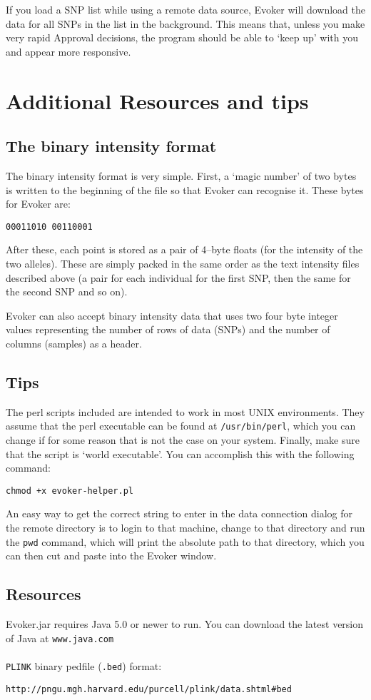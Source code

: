 \documentclass{article}
\begin{document}
If you load a SNP list while using a remote data source, Evoker will download the data for all SNPs in the list in the background. This means that, unless you make very rapid Approval decisions, the program should be able to `keep up' with you and appear more responsive.

\section{Additional Resources and tips}

\subsection{The binary intensity format}

The binary intensity format is very simple. First, a `magic number' of two bytes is written to the beginning of the file so that Evoker can recognise it. These bytes for Evoker are:
\begin{verbatim}
00011010 00110001
\end{verbatim}

\noindent After these, each point is stored as a pair of 4--byte floats (for the intensity of the two alleles). These are simply packed in the same order as the text intensity files described above (a pair for each individual for the first SNP, then the same for the second SNP and so on).

Evoker can also accept binary intensity data that uses two four byte integer values representing the number of rows of data (SNPs) and the number of columns (samples) as a header.

\subsection{Tips}

The perl scripts included are intended to work in most UNIX environments. They assume that the perl executable can be found at \texttt{/usr/bin/perl}, which you can change if for some reason that is not the case on your system.  Finally, make sure that the script is `world executable'. You can accomplish this with the following command: 

\begin{verbatim}
chmod +x evoker-helper.pl
\end{verbatim}

\noindent An easy way to get the correct string to enter in the data connection dialog for the remote directory is to login to that machine, change to that directory and run the \texttt{pwd} command, which will print the absolute path to that directory, which you can then cut and paste into the Evoker window.

\subsection{Resources}
Evoker.jar requires Java 5.0 or newer to run. You can download the latest version of Java at \texttt{www.java.com}
\\
\\
\texttt{PLINK} binary pedfile (\texttt{.bed}) format:  

\indent \texttt{http://pngu.mgh.harvard.edu/purcell/plink/data.shtml\#bed}
\end{document}
